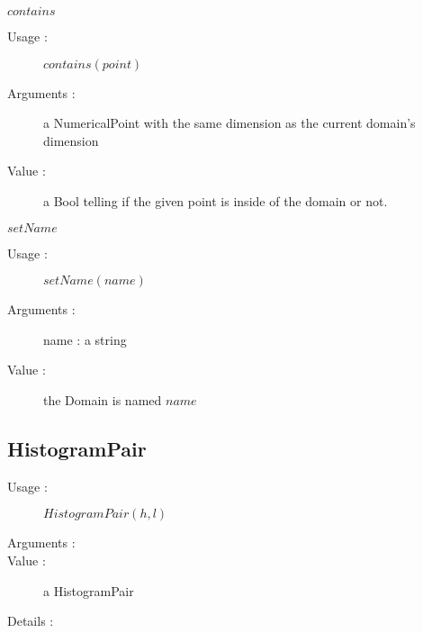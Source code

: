 \begin{description}
\begin{description}
  \item $contains$
    \begin{description}
    \item[Usage :] $contains(point)$
    \item[Arguments :] a NumericalPoint with the same dimension as the current domain's dimension
    \item[Value :] a Bool telling if the given point is inside of the domain or not.
    \end{description}

  \item $setName$
    \begin{description}
    \item[Usage :] $setName(name)$
    \item[Arguments :] name : a string
    \item[Value :] the Domain is named $name$
    \end{description}
    \bigskip

  \end{description}

\end{description}


\newpage \subsection{HistogramPair}


\begin{description}

\item[Usage :] $HistogramPair(h,l)$

\item[Arguments :]  \rule{0pt}{1em}

\item[Value :] a HistogramPair

\item[Details :] \rule{0pt}{1em}

\end{description}


